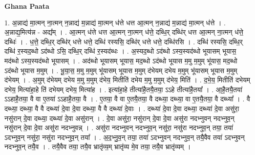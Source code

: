 \documentclass[17pt]{extarticle}
\begin{document}
\textbf{Ghana Paata } \newline

1. अ॒न्नाद्य॑ मा॒त्मन् ना॒त्मन् न॒न्नाद्य॑ म॒न्नाद्य॑ मा॒त्मन् ध॑त्ते धत्त आ॒त्मन् न॒न्नाद्य॑ म॒न्नाद्य॑ मा॒त्मन् ध॑त्ते । . अ॒न्नाद्य॒मित्य॑न्न - अद्य᳚म् । . आ॒त्मन् ध॑त्ते धत्त आ॒त्मन् ना॒त्मन् ध॑त्ते॒ दब्धि॒र् दब्धि॑र् धत्त आ॒त्मन् ना॒त्मन् ध॑त्ते॒ दब्धिः॑ । . ध॒त्ते॒ दब्धि॒र् दब्धि॑र् धत्ते धत्ते॒ दब्धि॑ रस्यसि॒ दब्धि॑र् धत्ते धत्ते॒ दब्धि॑रसि । . दब्धि॑ रस्यसि॒ दब्धि॒र् दब्धि॑ र॒स्यद॒ब्धो ऽद॑ब्धो ऽसि॒ दब्धि॒र् दब्धि॑ र॒स्यद॑ब्धः । . अ॒स्यद॒ब्धो ऽद॑ब्धो ऽस्य॒स्यद॑ब्धो भूयासम् भूयास॒ मद॑ब्धो ऽस्य॒स्यद॑ब्धो भूयासम् । . अद॑ब्धो भूयासम् भूयास॒ मद॒ब्धो ऽद॑ब्धो भूयास म॒मु म॒मुम् भू॑यास॒ मद॒ब्धो ऽद॑ब्धो भूयास म॒मुम् । . भू॒या॒स॒ म॒मु म॒मुम् भू॑यासम् भूयास म॒मुम् द॑भेयम् दभेय म॒मुम् भू॑यासम् भूयास म॒मुम् द॑भेयम् । . अ॒मुम् द॑भेयम् दभेय म॒मु म॒मुम् द॑भेय॒ मितीति॑ दभेय म॒मु म॒मुम् द॑भेय॒ मिति॑ । . द॒भे॒य॒ मितीति॑ दभेयम् दभेय॒ मित्या॑हा॒हे ति॑ दभेयम् दभेय॒ मित्या॑ह । . इत्या॑हा॒हे तीत्या॑है॒तयै॒तया॒ ऽऽहे तीत्या॑है॒तया᳚ । . आ॒है॒तयै॒तया॑ ऽऽहाहै॒तया॒ वै वा ए॒तया॑ ऽऽहाहै॒तया॒ वै । . ए॒तया॒ वै वा ए॒तयै॒तया॒ वै दब्ध्या॒ दब्ध्या॒ वा ए॒तयै॒तया॒ वै दब्ध्या᳚ । . वै दब्ध्या॒ दब्ध्या॒ वै वै दब्ध्या॑ दे॒वा दे॒वा दब्ध्या॒ वै वै दब्ध्या॑ दे॒वाः । . दब्ध्या॑ दे॒वा दे॒वा दब्ध्या॒ दब्ध्या॑ दे॒वा असु॑रा॒ नसु॑रान् दे॒वा दब्ध्या॒ दब्ध्या॑ दे॒वा असु॑रान् । . दे॒वा असु॑रा॒ नसु॑रान् दे॒वा दे॒वा असु॑रा नदभ्नुवन् नदभ्नुव॒न् नसु॑रान् दे॒वा दे॒वा असु॑रा नदभ्नुवन्न् । . असु॑रा नदभ्नुवन् नदभ्नुव॒न् नसु॑रा॒ नसु॑रा नदभ्नुव॒न् तया॒ तया॑ ऽदभ्नुव॒न् नसु॑रा॒ नसु॑रा नदभ्नुव॒न् तया᳚ । . अ॒द॒भ्नु॒व॒न् तया॒ तया॑ ऽदभ्नुवन् नदभ्नुव॒न् तयै॒वैव तया॑ ऽदभ्नुवन् नदभ्नुव॒न् तयै॒व । . तयै॒वैव तया॒ तयै॒व भ्रातृ॑व्य॒म् भ्रातृ॑व्य मे॒व तया॒ तयै॒व भ्रातृ॑व्यम् । \newline
\end{document}
